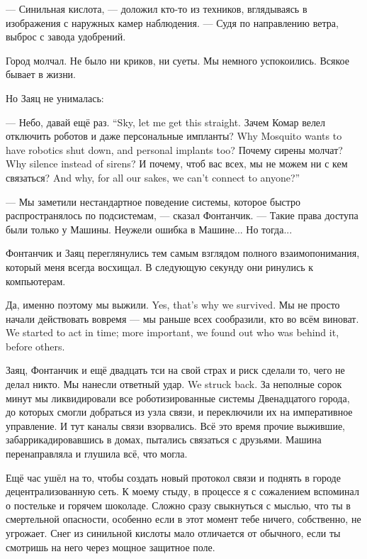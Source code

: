 --- Синильная кислота, --- доложил кто-то из техников, вглядываясь в изображения с наружных камер наблюдения.
--- Судя по направлению ветра, выброс с завода удобрений.

Город молчал.
Не было ни криков, ни суеты.
Мы немного успокоились.
Всякое бывает в жизни.

Но Заяц не унималась:

{--- Небо, давай ещё раз.}
{``Sky, let me get this straight.}
{Зачем Комар велел отключить роботов и даже персональные импланты?}
{Why Mosquito wants to have robotics shut down, and personal implants too?}
{Почему сирены молчат?}
{Why silence instead of sirens?}
{И почему, чтоб вас всех, мы не можем ни с кем связаться?}
{And why, for all our sakes, we can't connect to anyone?''}

--- Мы заметили нестандартное поведение системы, которое быстро распространялось по подсистемам, --- сказал Фонтанчик.
--- Такие права доступа были только у Машины.
Неужели ошибка в Машине...
Но тогда...

Фонтанчик и Заяц переглянулись тем самым взглядом полного взаимопонимания, который меня всегда восхищал.
В следующую секунду они ринулись к компьютерам.

{Да, именно поэтому мы выжили.}
{Yes, that's why we survived.}
{Мы не просто начали действовать вовремя --- мы раньше всех сообразили, кто во всём виноват.}
{We started to act in time; more important, we found out who was behind it, before others.}

Заяц, Фонтанчик и ещё двадцать тси на свой страх и риск сделали то, чего не делал никто.
{Мы нанесли ответный удар.}
{We struck back.}
За неполные сорок минут мы ликвидировали все роботизированные системы Двенадцатого города, до которых смогли добраться из узла связи, и переключили их на императивное управление.
И тут каналы связи взорвались.
Всё это время прочие выжившие, забаррикадировавшись в домах, пытались связаться с друзьями.
Машина перенаправляла и глушила всё, что могла.

Ещё час ушёл на то, чтобы создать новый протокол связи и поднять в городе децентрализованную сеть.
К моему стыду, в процессе я с сожалением вспоминал о постельке и горячем шоколаде.
Сложно сразу свыкнуться с мыслью, что ты в смертельной опасности, особенно если в этот момент тебе ничего, собственно, не угрожает.
Снег из синильной кислоты мало отличается от обычного, если ты смотришь на него через мощное защитное поле.

